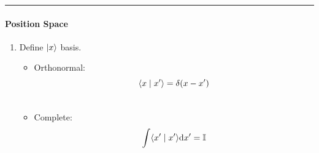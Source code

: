 \documentclass[letterpaper,10pt,english]{sphinxmanual}
\begin{document}
\bigskip\hrule{}\bigskip



\paragraph{Position Space}
\label{QuantumMechanics:position-space}\begin{enumerate}
\item {} 
Define $\left| x\right\rangle$ basis.
\begin{itemize}
\item {} 
Orthonormal:
\begin{gather}
\begin{split}\langle x \mid x' \rangle=\delta(x-x')\end{split}\notag\\\begin{split}\end{split}\notag
\end{gather}
\item {} 
Complete:
\begin{gather}
\begin{split}\int \langle x' \mid x' \rangle \mathrm{d} x' = \mathbb{I}\end{split}\notag\\\begin{split}\end{split}\notag
\end{gather}
\end{itemize}


\end{enumerate}
\end{document}
